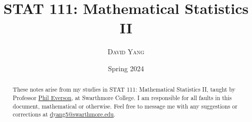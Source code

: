 \documentclass[11pt]{article}
\begin{document}
\title{\LARGE \textbf{STAT 111: Mathematical Statistics II}}
\date{Spring 2024}
\author{\textsc{David Yang}}

\maketitle

\begin{abstract}
These notes arise from my studies in STAT 111: Mathematical Statistics II, taught by 
Professor \href{https://www.swarthmore.edu/NatSci/peverso1/}{Phil Everson}, at Swarthmore College.
I am responsible for all faults in this document, mathematical or otherwise.
Feel free to message me with any suggestions or corrections at \href{mailto:dyang5@swarthmore.edu}{dyang5@swarthmore.edu}.
\end{abstract}

\tableofcontents

\newpage

\end{document}
